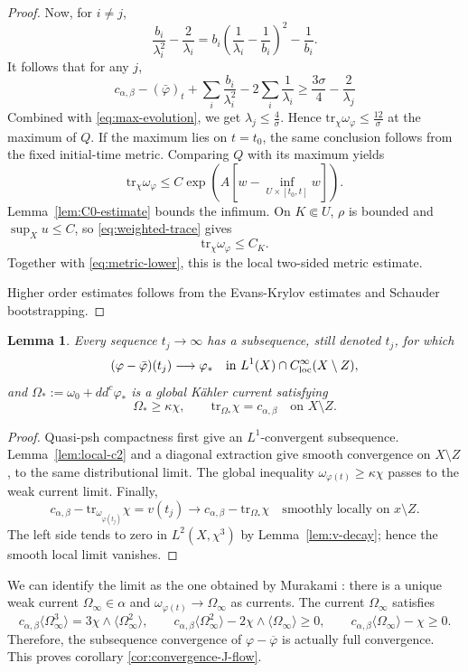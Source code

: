 \documentclass[reqno]{amsart}
\theoremstyle{remark}
\def\tr{\text{tr}}
\newcommand{\ddc}{dd^c}
\newcommand{\cab}{c_{\alpha,\beta}}
\theoremstyle{plain}
\newtheorem{lemma}[thm]{Lemma}
\begin{document}
\begin{proof}
Now, for $i\ne j$, \[
\frac{b_i}{\lambda_i^2}-\frac{2}{\lambda_i}=b_i\left(\frac{1}{\lambda_i}-\frac{1}{b_i}\right)^2-\frac{1}{b_i}.
\]
It follows that for any $j$, \[
\cab-(\bar{\varphi})_t+\sum_{i}\frac{b_i}{\lambda_i^2}-2\sum_{i}\frac{1}{\lambda_i}\geq \frac{3\sigma}{4}-\frac{2}{\lambda_j}
\]
Combined with \eqref{eq:max-evolution}, we get $\lambda_j\leq \frac{4}{\sigma}$. Hence $\tr_\chi\omega_\varphi\leq \frac{12}{\sigma}$ at the maximum of $Q$. 
If the maximum lies on $t=t_0$, the same
conclusion follows from the fixed initial-time metric.  Comparing
$Q$ with its maximum yields
\begin{equation}\label{eq:weighted-trace}
 \tr_\chi\omega_\varphi
 \leq
 C\exp\!\left(
 A\left[w-\inf_{U\times[t_0,t]}w\right]\right).
\end{equation}
Lemma~\ref{lem:C0-estimate} bounds the infimum.  On
$K\Subset U$, $\rho$ is bounded and $\sup_Xu\leq C$, so
\eqref{eq:weighted-trace} gives
\[
 \tr_\chi\omega_\varphi\leq C_K.
\]
Together with \eqref{eq:metric-lower}, this is the local two-sided
metric estimate.

Higher order estimates follows from the Evans-Krylov estimates and Schauder bootstrapping. 
\end{proof}

\begin{lemma}\label{lem:subsequence-weak-limit}
    Every sequence
$t_j\to\infty$ has a subsequence, still denoted $t_j$, for which
\[
( \varphi-\bar\varphi)(t_j)\longrightarrow \varphi_*
 \quad\text{in }L^1(X)\cap C^\infty_{\rm loc}(X\setminus Z),
\]
and
$\Omega_*:=\omega_0+\ddc \varphi_*$ is a global K\"ahler current satisfying
\[
 \Omega_*\geq\kappa\chi,\qquad
 \tr_{\Omega_*}\chi=\cab\quad\text{on }X\setminus Z.
\]
\end{lemma}
\begin{proof}
Quasi-psh compactness first give an
$L^1$-convergent subsequence.  Lemma~\ref{lem:local-c2} and a
diagonal extraction give smooth convergence on $X\setminus Z$, to the same
distributional limit.  The global inequality
$\omega_{\varphi(t)}\geq\kappa\chi$ passes to the weak current
limit.  Finally,
\[
 \cab-\tr_{\omega_{\varphi(t_j)}}\chi=v(t_j)
 \longrightarrow\cab-\tr_{\Omega_*}\chi
 \quad\text{smoothly locally on }x\setminus Z.
\]
The left side tends to zero in $L^2(X,\chi^3)$ by
Lemma~\ref{lem:v-decay}; hence the smooth local limit vanishes.
\end{proof}

We can identify the limit as the one obtained by Murakami \cite{M26b}: there is a unique weak current $\Omega_\infty\in \alpha$ and $\omega_{\varphi(t)}\to \Omega_\infty$ as currents. The current $\Omega_\infty$ satisfies \[
\cab\langle\Omega_\infty^3\rangle=3\chi\wedge\langle\Omega_\infty^2\rangle, \qquad \cab\langle\Omega_\infty^2\rangle-2\chi\wedge\langle\Omega_\infty\rangle\geq 0, \qquad \cab\langle \Omega_\infty\rangle-\chi\geq 0. 
\]
Therefore, the subsequence convergence of $\varphi-\overline{\varphi}$ is actually full convergence. This proves corollary \ref{cor:convergence-J-flow}.

\AtNextBibliography{\small}
\begingroup
\setlength\bibitemsep{2pt}
\printbibliography
\end{document}
